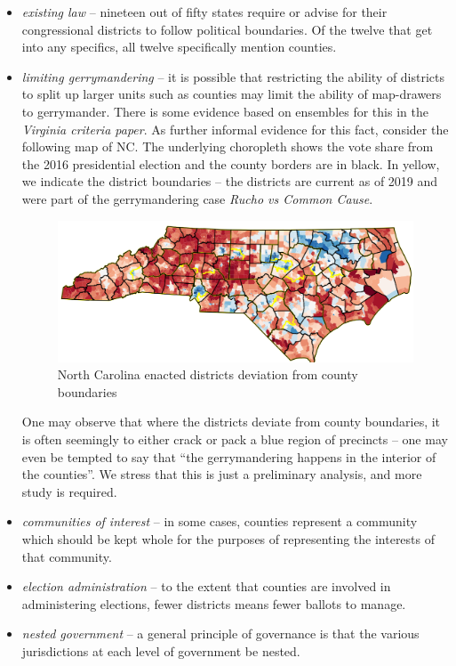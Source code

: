 \documentclass{mgggarticle}
\begin{document}
\begin{itemize}
\item \emph{existing law} -- nineteen out of fifty states require or advise for their congressional districts to follow political boundaries. Of the twelve that get into any specifics, all twelve specifically mention counties.

\item \emph{limiting gerrymandering} -- it is possible that restricting the ability of districts to split up larger units such as counties may limit the ability of map-drawers to gerrymander.  There is some evidence based on ensembles for this in the \emph{Virginia criteria paper}. As further informal evidence for this fact, consider the following map of NC. The underlying choropleth shows the vote share from the 2016 presidential election and the county borders are in black. In yellow, we indicate the district boundaries -- the districts are current as of 2019 and were part of the gerrymandering case \emph{Rucho vs Common Cause}. 
\begin{figure}[h]
\centering
\includegraphics[width=\textwidth]{figs/NC_counties.png}
\caption{North Carolina enacted districts deviation from county boundaries}
\end{figure}
One may observe that where the districts deviate from county boundaries, it is often seemingly to either crack or pack a blue region of precincts -- one may even be tempted to say that ``the gerrymandering happens in the interior of the counties''. We stress that this is just a preliminary analysis, and more study is required.

\item \emph{communities of interest} -- in some cases, counties represent a community which should be kept whole for the purposes of representing the interests of that community. 

\item \emph{election administration} -- to the extent that counties are involved in administering elections, fewer districts means fewer ballots to manage.

\item \emph{nested government} -- a general principle of governance is that the various jurisdictions at each level of government be nested.
\end{itemize}
 
\end{document}
